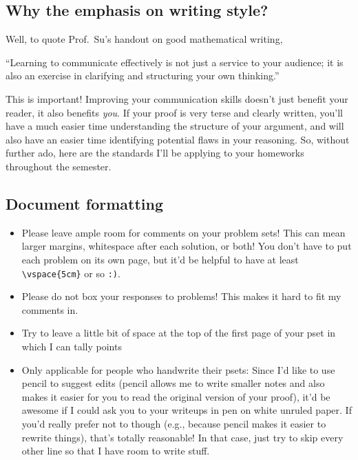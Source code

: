 \documentclass{fkpset}
\begin{document}
\subsection{Why the emphasis on writing style?}\label{sec:rationale}
Well, to quote Prof.\ Su's handout on good mathematical writing,
\begin{leftbar}
  ``Learning to communicate effectively is not just a service to your audience;
  it is also an exercise in clarifying and structuring your own thinking.''
\end{leftbar}
This is important! Improving your communication skills doesn't just benefit your
reader, it also benefits \emph{you}. If your proof is very terse and clearly
written, you'll have a much easier time understanding the structure of your
argument, and will also have an easier time identifying potential flaws in your
reasoning. So, without further ado, here are the standards I'll be applying
to your homeworks throughout the semester.

\subsection{Document formatting}
\begin{itemize}
  \item Please leave ample room for comments on your problem sets! This can mean
    larger margins, whitespace after each solution, or both! You don't have to
    put each problem on its own page, but it'd be helpful to have at least
    \verb|\vspace{5cm}| or so \texttt{:)}.
  \item Please do not box your responses to problems! This makes it hard to fit
    my comments in.
  \item Try to leave a little bit of space at the top of the first page of your
    pset in which I can tally points
  \item Only applicable for people who handwrite their psets: Since I'd like to
    use pencil to suggest edits (pencil allows me to write smaller notes and
    also makes it easier for you to read the original version of your proof),
    it'd be awesome if I could ask you to your writeups in pen on white unruled
    paper. If you'd really prefer not to though (e.g., because pencil makes it
    easier to rewrite things), that's totally reasonable! In that case, just try
    to skip every other line so that I have room to write stuff.
\end{itemize}
\end{document}
